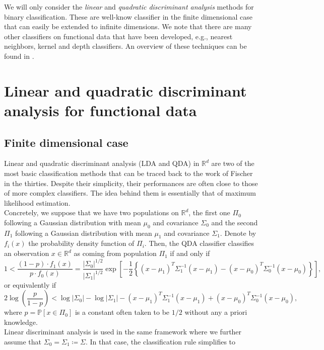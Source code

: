 \documentclass[10pt, a4paper]{report}
\newcommand{\R}[0]{\mathbb{R}}
\newcommand{\Pp}[0]{\mathbb{P}}
\theoremstyle{definition}
\theoremstyle{remark}
\begin{document}
We will only consider the \emph{linear} and \emph{quadratic discriminant analysis} methods for binary classification. These are well-know classifier in the finite dimensional case that can easily be extended to infinite dimensions. We note that there are many other classifiers on functional data that have been developed, e.g., nearest neighbors, kernel and depth classifiers. An overview of these techniques can be found in \cite[Chapter 10]{oxford}.

\section{Linear and quadratic discriminant analysis for functional data}
\subsection{Finite dimensional case}
Linear and quadratic discriminant analysis (LDA and QDA) in $\R^d$ are two of the most basic classification methods that can be traced back to the work of Fischer in the thirties. Despite their simplicity, their performances are often close to those of more complex classifiers. The idea behind them is essentially that of maximum likelihood estimation.\\
Concretely, we suppose that we have two populations on $\R^d$, the first one $\Pi_0$ following a Gaussian distribution with mean $\mu_0$ and covariance $\Sigma_0$ and the second $\Pi_1$ following a Gaussian distribution with mean $\mu_1$ and covariance $\Sigma_1$. Denote by $f_i(x)$ the probability density function of $\Pi_i$. Then, the QDA classifier classifies an observation $x\in \R^d$ as coming from population $\Pi_1$ if and only if 
$$1<\frac{(1-p)\cdot f_1(x)}{p\cdot f_0(x)}=\frac{\vert \Sigma_0\vert^{1/2}}{\vert \Sigma_1\vert^{1/2}}\exp\left[-\frac{1}{2}\left\{ (x-\mu_1)^T\Sigma_1^{-1} (x-\mu_1) - (x-\mu_0)^T\Sigma_0^{-1} (x-\mu_0) \right\} \right],$$
or equivalently if 
\begin{equation}\label{qdarule}
	2\log\left(\frac{p}{1-p}\right) < \log \vert \Sigma_0\vert - \log \vert \Sigma_1\vert - (x-\mu_1)^T\Sigma_1^{-1} (x-\mu_1) + (x-\mu_0)^T\Sigma_0^{-1} (x-\mu_0),
\end{equation}
where $p= \Pp[x \in \Pi_0]$ is a constant often taken to be $1/2$ without any a priori knowledge.\\
Linear discriminant analysis is used in the same framework where we further assume that $\Sigma_0 = \Sigma_1 \coloneqq \Sigma$. In that case, the classification rule simplifies to 
\end{document}
